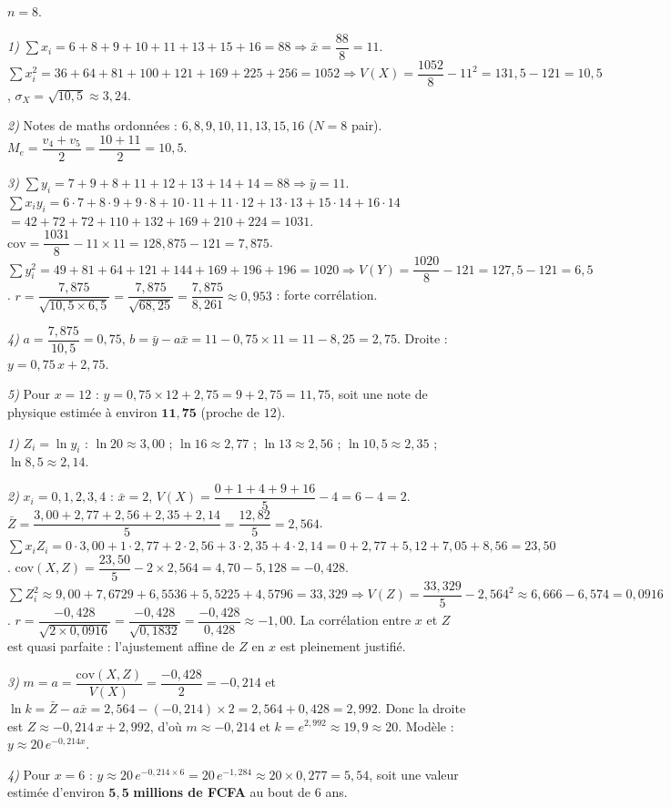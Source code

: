 $n=8$.
\smallskip

\noindent\textit{1)} $\sum x_i=6+8+9+10+11+13+15+16=88\Rightarrow\bar x=\dfrac{88}{8}=11$.
$\sum x_i^2=36+64+81+100+121+169+225+256=1052\Rightarrow V(X)=\dfrac{1052}{8}-11^2
=131{,}5-121=10{,}5$, $\sigma_X=\sqrt{10{,}5}\approx3{,}24$.
\smallskip

\noindent\textit{2)} Notes de maths ordonnées : $6,8,9,10,11,13,15,16$ ($N=8$ pair).
$M_e=\dfrac{v_4+v_5}{2}=\dfrac{10+11}{2}=10{,}5$.
\smallskip

\noindent\textit{3)} $\sum y_i=7+9+8+11+12+13+14+14=88\Rightarrow\bar y=11$.
$\sum x_iy_i=6\!\cdot\!7+8\!\cdot\!9+9\!\cdot\!8+10\!\cdot\!11+11\!\cdot\!12+13\!\cdot\!13+15\!\cdot\!14+16\!\cdot\!14$
$=42+72+72+110+132+169+210+224=1031$.
$\mathrm{cov}=\dfrac{1031}{8}-11\times11=128{,}875-121=7{,}875$.
$\sum y_i^2=49+81+64+121+144+169+196+196=1020\Rightarrow V(Y)=\dfrac{1020}{8}-121=127{,}5-121=6{,}5$.
$r=\dfrac{7{,}875}{\sqrt{10{,}5\times6{,}5}}=\dfrac{7{,}875}{\sqrt{68{,}25}}=\dfrac{7{,}875}{8{,}261}\approx0{,}953$ : forte corrélation.
\smallskip

\noindent\textit{4)} $a=\dfrac{7{,}875}{10{,}5}=0{,}75$, $b=\bar y-a\bar x=11-0{,}75\times11=11-8{,}25=2{,}75$.
Droite : $y=0{,}75\,x+2{,}75$.
\smallskip

\noindent\textit{5)} Pour $x=12$ : $y=0{,}75\times12+2{,}75=9+2{,}75=11{,}75$, soit une note de
physique estimée à environ $\mathbf{11{,}75}$ (proche de $12$).

\textit{1)} $Z_i=\ln y_i$ : $\ln20\approx3{,}00$ ; $\ln16\approx2{,}77$ ; $\ln13\approx2{,}56$ ;
$\ln10{,}5\approx2{,}35$ ; $\ln8{,}5\approx2{,}14$.
\smallskip

\noindent\textit{2)} $x_i=0,1,2,3,4$ : $\bar x=2$, $V(X)=\dfrac{0+1+4+9+16}{5}-4=6-4=2$.
$\bar Z=\dfrac{3{,}00+2{,}77+2{,}56+2{,}35+2{,}14}{5}=\dfrac{12{,}82}{5}=2{,}564$.
$\sum x_iZ_i=0\!\cdot\!3{,}00+1\!\cdot\!2{,}77+2\!\cdot\!2{,}56+3\!\cdot\!2{,}35+4\!\cdot\!2{,}14
=0+2{,}77+5{,}12+7{,}05+8{,}56=23{,}50$.
$\mathrm{cov}(X,Z)=\dfrac{23{,}50}{5}-2\times2{,}564=4{,}70-5{,}128=-0{,}428$.
$\sum Z_i^2\approx9{,}00+7{,}6729+6{,}5536+5{,}5225+4{,}5796=33{,}329\Rightarrow
V(Z)=\dfrac{33{,}329}{5}-2{,}564^2\approx6{,}666-6{,}574=0{,}0916$.
$r=\dfrac{-0{,}428}{\sqrt{2\times0{,}0916}}=\dfrac{-0{,}428}{\sqrt{0{,}1832}}=\dfrac{-0{,}428}{0{,}428}\approx-1{,}00$.
La corrélation entre $x$ et $Z$ est quasi parfaite : l'ajustement affine de $Z$ en $x$ est
pleinement justifié.
\smallskip

\noindent\textit{3)} $m=a=\dfrac{\mathrm{cov}(X,Z)}{V(X)}=\dfrac{-0{,}428}{2}=-0{,}214$ et
$\ln k=\bar Z-a\bar x=2{,}564-(-0{,}214)\times2=2{,}564+0{,}428=2{,}992$.
Donc la droite est $Z\approx-0{,}214\,x+2{,}992$, d'où $m\approx-0{,}214$ et
$k=e^{2{,}992}\approx19{,}9\approx20$. Modèle : $y\approx20\,e^{-0{,}214x}$.
\smallskip

\noindent\textit{4)} Pour $x=6$ : $y\approx20\,e^{-0{,}214\times6}=20\,e^{-1{,}284}
\approx20\times0{,}277=5{,}54$, soit une valeur estimée d'environ
$\mathbf{5{,}5}$ \textbf{millions de FCFA} au bout de $6$ ans.
